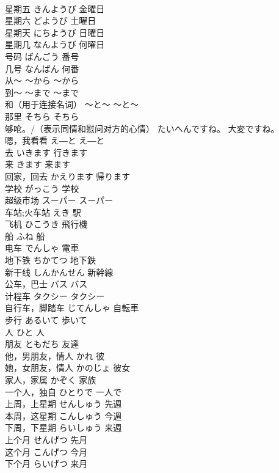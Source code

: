 \documentclass[8pt]{extreport}
\begin{document}
\begin{CJK}{UTF8}{min}
\\	星期五	きんようび	金曜日
\\	星期六	どようび	土曜日
\\	星期天	にちようび	日曜日
\\	星期几	なんようび	何曜日
\\	号码	ばんごう	番号
\\	几号	なんばん	何番
\\	从～	～から	～から
\\	到～	～まで	～まで
\\	和（用于连接名词）	～と～	～と～
\\	那里	そちら	そちら
\\	够呛。/（表示同情和慰问对方的心情）	たいへんですね。	大変ですね。
\\	嗯，我看看	え―と	え―と
\\	去	いきます	行きます
\\	来	きます	来ます
\\	回家，回去	かえります	帰ります
\\	学校	がっこう	学校
\\	超级市场	スーパー	スーパー
\\	车站;火车站	えき	駅
\\	飞机	ひこうき	飛行機
\\	船	ふね	船
\\	电车	でんしゃ	電車
\\	地下铁	ちかてつ	地下鉄
\\	新干线	しんかんせん	新幹線
\\	公车，巴士	バス	バス
\\	计程车	タクシー	タクシー
\\	自行车，脚踏车	じてんしゃ	自転車
\\	步行	あるいて	歩いて
\\	人	ひと	人
\\	朋友	ともだち	友達
\\	他，男朋友，情人	かれ	彼
\\	她，女朋友，情人	かのじょ	彼女
\\	家人，家属	かぞく	家族
\\	一个人，独自	ひとりで	一人で
\\	上周，上星期	せんしゅう	先週
\\	本周，这星期	こんしゅう	今週
\\	下周，下星期	らいしゅう	来週
\\	上个月	せんげつ	先月
\\	这个月	こんげつ	今月
\\	下个月	らいげつ	来月

\end{CJK}
\end{document}
